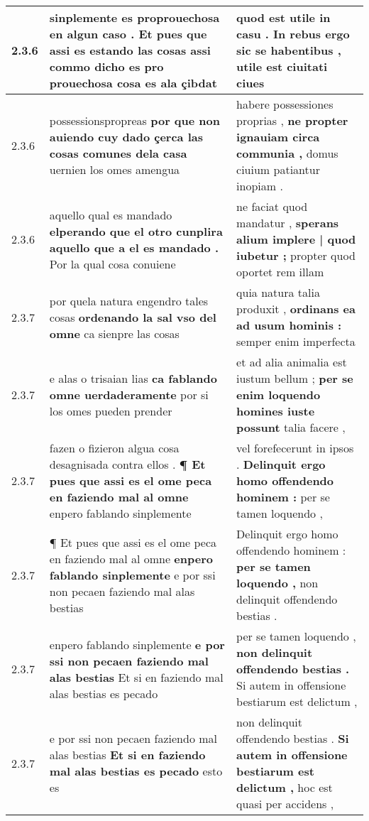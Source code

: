 \begin{tabular}{|p{1cm}|p{6.5cm}|p{6.5cm}|}
2.3.6 & sinplemente es proprouechosa en algun caso . \textbf{ Et pues que assi es estando las cosas } assi commo dicho es pro prouechosa cosa es ala çibdat & quod est utile in casu . \textbf{ In rebus ergo sic se habentibus , } utile est ciuitati ciues \\\hline
2.3.6 & possessionspropreas \textbf{ por que non auiendo cuy dado çerca las cosas comunes dela casa } uernien los omes amengua & habere possessiones proprias , \textbf{ ne propter ignauiam circa communia , } domus ciuium patiantur inopiam . \\\hline
2.3.6 & aquello qual es mandado \textbf{ elperando que el otro cunplira aquello que a el es mandado . } Por la qual cosa conuiene & ne faciat quod mandatur , \textbf{ sperans alium implere | quod iubetur ; } propter quod oportet rem illam \\\hline
2.3.7 & por quela natura engendro tales cosas \textbf{ ordenando la sal vso del omne } ca sienpre las cosas & quia natura talia produxit , \textbf{ ordinans ea ad usum hominis : } semper enim imperfecta \\\hline
2.3.7 & e alas o trisaian lias \textbf{ ca fablando omne uerdaderamente } por si los omes pueden prender & et ad alia animalia est iustum bellum ; \textbf{ per se enim loquendo homines iuste possunt } talia facere , \\\hline
2.3.7 & fazen o fizieron algua cosa desagnisada contra ellos . \textbf{ ¶ Et pues que assi es el ome peca en faziendo mal al omne } enpero fablando sinplemente & vel forefecerunt in ipsos . \textbf{ Delinquit ergo homo offendendo hominem : } per se tamen loquendo , \\\hline
2.3.7 & ¶ Et pues que assi es el ome peca en faziendo mal al omne \textbf{ enpero fablando sinplemente } e por ssi non pecaen faziendo mal alas bestias & Delinquit ergo homo offendendo hominem : \textbf{ per se tamen loquendo , } non delinquit offendendo bestias . \\\hline
2.3.7 & enpero fablando sinplemente \textbf{ e por ssi non pecaen faziendo mal alas bestias } Et si en faziendo mal alas bestias es pecado & per se tamen loquendo , \textbf{ non delinquit offendendo bestias . } Si autem in offensione bestiarum est delictum , \\\hline
2.3.7 & e por ssi non pecaen faziendo mal alas bestias \textbf{ Et si en faziendo mal alas bestias es pecado } esto es & non delinquit offendendo bestias . \textbf{ Si autem in offensione bestiarum est delictum , } hoc est quasi per accidens , \\\hline

\end{tabular}

